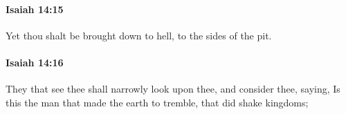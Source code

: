 		\paragraph{Isaiah 14:15} %
			\label{ISAIAH-14-15}

			Yet thou shalt be brought down to hell, to the sides of the pit.


		\paragraph{Isaiah 14:16} %
			\label{ISAIAH-14-16}

			They that see thee shall narrowly look upon thee, and consider thee, saying, Is this the man that made the earth to tremble, that did shake kingdoms;


